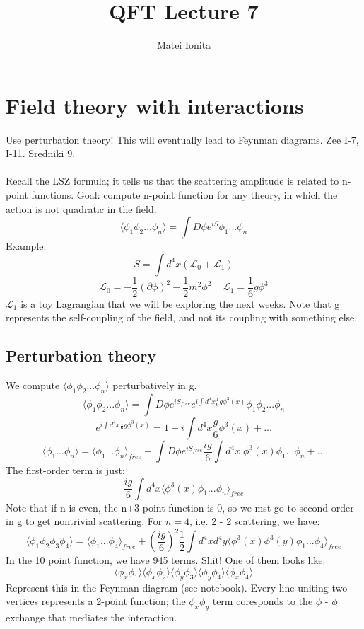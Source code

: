 \documentclass[12 pt]{article}
\title{QFT Lecture 7}
\author{Matei Ionita}
\begin{document}
  \maketitle

\section*{Field theory with interactions}
Use perturbation theory! This will eventually lead to Feynman diagrams. Zee I-7, I-11. Sredniki 9.
\\
\\
Recall the LSZ formula; it tells us that the scattering amplitude is related to n-point functions. Goal: compute n-point function for any theory, in which the action is not quadratic in the field.
\[  \langle \phi_1 \phi_2 ... \phi_n\rangle = \int D\phi e^{iS} \phi_1 ... \phi_n  \]
Example:
\[ S = \int d^4 x (\mathcal{L}_0 + \mathcal{L}_1 )  \]
\[  \mathcal{L}_0 = -\frac{1}{2} (\partial \phi)^2 - \frac{1}{2} m^2 \phi^2 \;\;\;\; \mathcal{L}_1 = \frac{1}{6} g \phi^3 \]
$\mathcal{L}_1$ is a toy Lagrangian that we will be exploring the next weeks. Note that g represents the self-coupling of the field, and not its coupling with something else.

\subsection*{Perturbation theory}
We compute $ \langle \phi_1 \phi_2 ... \phi_n\rangle$ perturbatively in g.
\[   \langle \phi_1 \phi_2 ... \phi_n\rangle = \int D\phi e^{iS_{free}} e^{i\int d^4 x \frac{1}{6} g \phi^3 (x)}  \phi_1 \phi_2 ... \phi_n \]
\[ e^{i\int d^4 x \frac{1}{6} g \phi^3 (x)} = 1 + i\int d^4 x \frac{g}{6} \phi^3 (x) + ...  \]
\[  \langle \phi_1 ... \phi_n\rangle = \langle \phi_1 ... \phi_n\rangle_{free}   +  \int D\phi e^{iS_{free}} \frac{ig}{6} \int d^4 x \;\phi^3(x)  \phi_1 ... \phi_n + ...  \]
The first-order term is just:
\[ \frac{ig}{6} \int d^4 x  \langle\phi^3(x) \phi_1 ... \phi_n\rangle_{free}  \]
Note that if n is even, the n+3 point function is 0, so we mst go to second order in g to get nontrivial scattering. For $n=4$, i.e. 2 - 2 scattering, we have:
\[  \langle \phi_1 \phi_2 \phi_3 \phi_4 \rangle = \langle \phi_1 ... \phi_4 \rangle_{free} +  \left(\frac{ig}{6}\right)^2 \frac{1}{2} \int d^4 x d^4 y \langle \phi^3(x) \phi^3(y) \phi_1 ... \phi_4 \rangle_{free} \]
In the 10 point function, we have 945 terms. Shit! One of them looks like:
\[  \langle \phi_x \phi_1 \rangle \langle \phi_x \phi_2 \rangle \langle \phi_y \phi_3 \rangle \langle \phi_y \phi_4 \rangle \langle \phi_x \phi_4 \rangle  \]
Represent this in the Feynman diagram (see notebook). Every line uniting two vertices represents a 2-point function; the $\phi_x \phi_y$ term coresponds to the $\phi$ - $\phi$ exchange that mediates the interaction.
\end{document}

